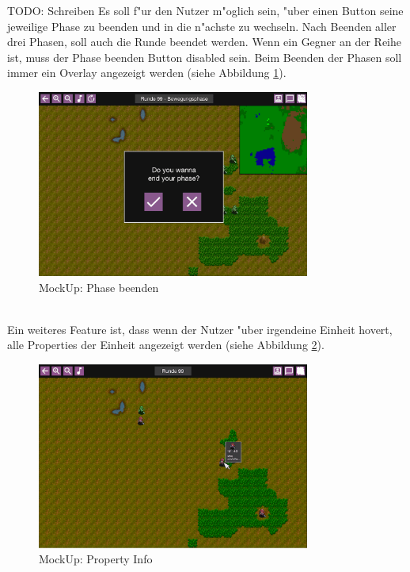 \documentclass[12pt, titlepage]{scrartcl}
\newcounter{subsubsubsection}[subsubsection]
\begin{document}
			        TODO: Schreiben
			        Es soll f"ur den Nutzer m"oglich sein, "uber einen Button seine jeweilige Phase zu beenden und in die n"achste zu wechseln. Nach Beenden aller drei Phasen, soll auch die Runde beendet werden. Wenn ein Gegner an der Reihe ist, muss der Phase beenden Button disabled sein. Beim Beenden der Phasen soll immer ein Overlay angezeigt werden (siehe Abbildung \ref{Phase_End}). \\
			        \begin{figure}[H] 
    				    \centering
    				    \includegraphics[width=0.8\textwidth]{images/mockUps/EndPhase.png}
    				    \caption{MockUp: Phase beenden}
    				    \label{Phase_End}
			        \end{figure}
			        \ \\ Ein weiteres Feature ist, dass wenn der Nutzer "uber irgendeine Einheit hovert, alle Properties der Einheit angezeigt werden (siehe Abbildung \ref{Property_Info}). \\
			        \begin{figure}[H] 
    				    \centering
    				    \includegraphics[width=0.8\textwidth]{images/mockUps/showPropertiesWhenHovered.png}
    				    \caption{MockUp: Property Info}
    				    \label{Property_Info}
			        \end{figure}
\end{document}
